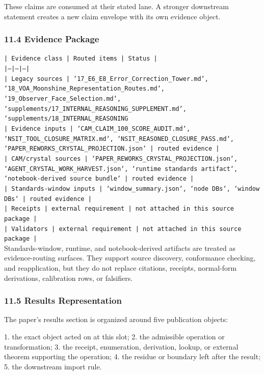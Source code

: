 \documentclass[11pt]{article}
\begin{document}
These claims are consumed at their stated lane. A stronger downstream statement
creates a new claim envelope with its own evidence object.

\subsubsection*{11.4 Evidence Package}

\noindent\texttt{| Evidence class | Routed items | Status |}\\
\noindent\texttt{|---|---|---|}\\
\noindent\texttt{| Legacy sources | `17\_E6\_E8\_Error\_Correction\_Tower.md`, `18\_VOA\_Moonshine\_Representation\_Routes.md`, `19\_Observer\_Face\_Selection.md`, `supplements/17\_INTERNAL\_REASONING\_SUPPLEMENT.md`, `supplements/18\_INTERNAL\_REASONING}\\
\noindent\texttt{| Evidence inputs | `CAM\_CLAIM\_100\_SCORE\_AUDIT.md`, `NSIT\_TOOL\_CLOSURE\_MATRIX.md`, `NSIT\_REASONED\_CLOSURE\_PASS.md`, `PAPER\_REWORKS\_CRYSTAL\_PROJECTION.json` | routed evidence |}\\
\noindent\texttt{| CAM/crystal sources | `PAPER\_REWORKS\_CRYSTAL\_PROJECTION.json`, `AGENT\_CRYSTAL\_WORK\_HARVEST.json`, `runtime standards artifact`, `notebook-derived source bundle` | routed evidence |}\\
\noindent\texttt{| Standards-window inputs | `window\_summary.json`, `node DBs`, `window DBs` | routed evidence |}\\
\noindent\texttt{| Receipts | external requirement | not attached in this source package |}\\
\noindent\texttt{| Validators | external requirement | not attached in this source package |}\\

Standards-window, runtime, and notebook-derived artifacts are treated
as evidence-routing surfaces. They support source discovery, conformance
checking, and reapplication, but they do not replace citations, receipts,
normal-form derivations, calibration rows, or falsifiers.

\subsubsection*{11.5 Results Representation}

The paper's results section is organized around five publication objects:

1. the exact object acted on at this slot;
2. the admissible operation or transformation;
3. the receipt, enumeration, derivation, lookup, or external theorem supporting
   the operation;
4. the residue or boundary left after the result;
5. the downstream import rule.
\end{document}
